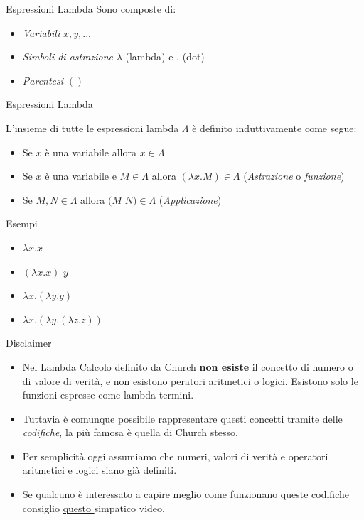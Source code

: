 \documentclass{beamer}
\begin{document}
\begin{frame}{Espressioni Lambda}
  Sono composte di:
\begin{itemize}
    \item \textit{Variabili} $x, y, ...$
    \item \textit{Simboli di astrazione} $\lambda$ (lambda) e $.$ (dot)
    \item \textit{Parentesi} $()$
\end{itemize}
\end{frame}
  
\begin{frame}{Espressioni Lambda}

  \begin{definition}
  L'insieme di tutte le espressioni lambda $\Lambda$ è definito induttivamente 
  come segue:
  \begin{itemize}
    \item Se $x$ è una variabile allora $x \in \Lambda$
    \item Se $x$ è una variabile e $M \in \Lambda$ allora $(\lambda x.M) \in
      \Lambda$ (\textit{Astrazione} o \textit{funzione})
    \item Se $M, N \in \Lambda$ allora $(M$ $N) \in \Lambda$ (\textit{Applicazione})
  \end{itemize}
\end{definition}

  \begin{exampleblock}{Esempi}

\begin{itemize}
  \item  $\lambda x . x$ 
  \item $(\lambda x. x)$ $y$
  \item  $\lambda x . (\lambda y. y)$ 
  \item  $\lambda x . (\lambda y. (\lambda z. z))$ 
\end{itemize}
\end{exampleblock}
\end{frame}

\begin{frame}{Disclaimer}
\begin{itemize}
  \item Nel Lambda Calcolo definito da Church \textbf{non esiste} il concetto
    di numero o di valore di verità, e non esistono peratori aritmetici o logici.
    Esistono solo le funzioni espresse come lambda termini.
  \item Tuttavia è comunque possibile rappresentare questi concetti tramite delle
    \textit{codifiche}, la più famosa è quella di Church stesso.
  \item Per semplicità oggi assumiamo che numeri, valori di verità e operatori
    aritmetici e logici siano già definiti.
  \item Se qualcuno è interessato a capire meglio come funzionano queste codifiche
    consiglio \alert{\href{https://www.youtube.com/watch?v=RsO_sfHtXCM&ab_channel=Truttle1}{
      questo }} simpatico video.
\end{itemize}

\end{frame}
\end{document}
